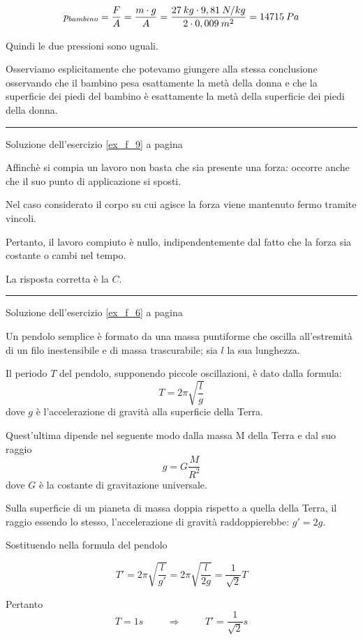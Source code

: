 \[p_{bambino}={F\over A}={m\cdot g\over A}={27\: kg\cdot 9,81\: N/kg\over 2\cdot 0,009\: m^2}=14715\: Pa\]


Quindi le due pressioni sono uguali.

Osserviamo esplicitamente che potevamo giungere alla stessa conclusione osservando che il bambino pesa esattamente la metà della donna e che la superficie dei piedi del bambino è esattamente la metà della superficie dei piedi della donna.


\vspace{1cm}
\hrule
\vspace{1cm}

Soluzione dell'esercizio \ref{ex_f_9} a pagina \pageref{ex_f_9}\label{sol_f_9}

Affinchè si compia un lavoro non basta che sia presente una forza: occorre anche che il suo punto di applicazione si sposti.

Nel caso considerato il corpo su cui agisce la forza viene mantenuto fermo tramite vincoli.

Pertanto, il lavoro compiuto è nullo, indipendentemente dal fatto che la forza sia costante o cambi nel tempo.

La risposta corretta è la $C$.


\vspace{1cm}
\hrule
\vspace{1cm}

Soluzione dell'esercizio \ref{ex_f_6} a pagina \pageref{ex_f_6}\label{sol_f_6}

Un pendolo semplice è formato da una massa puntiforme che oscilla all’estremità di un filo inestensibile e di massa trascurabile; sia $l$ la sua lunghezza.

Il periodo $T$ del pendolo, supponendo piccole oscillazioni, è dato dalla formula: 
\[
T=2\pi\sqrt{\frac{l}{g}}
\]
dove $g$ è l’accelerazione di gravità alla superficie della Terra.

Quest’ultima dipende nel seguente modo dalla massa M della Terra e dal suo raggio 
\[
g=G\frac{M}{R^2}
\]
dove $G$ è la costante di gravitazione universale.

Sulla superficie di un pianeta di massa doppia rispetto a quella
della Terra, il raggio essendo lo stesso, l’accelerazione di gravità raddoppierebbe: $g'=2g$.

Sostituendo nella formula del pendolo

\[
T'=2\pi\sqrt{\frac{l}{g'}}=2\pi\sqrt{\frac{l}{2g}}=\frac{1}{\sqrt{2}}T
\]

Pertanto 
\[T = 1s\hspace{1cm}\Rightarrow \hspace{1cm}T'=\frac{1}{\sqrt{2}}s
\]

